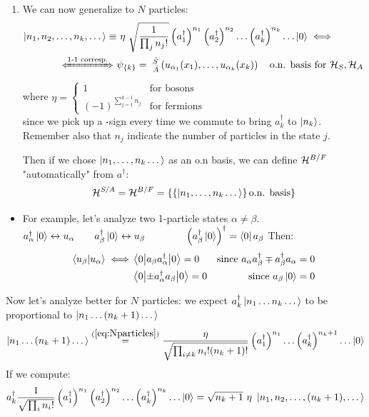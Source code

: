 \begin{enumerate}[label=\roman*.]
    \item We can now generalize to $N$ particles:
    \begin{align}
        \ket{n_1,n_2,\dots,n_k,\dots} \equiv& \ \eta \  \sqrt{\frac1{\prod_j n_j!}}\left(a_1^\dag\right)^{n_1}\left(a_2^\dag\right)^{n_2} \dots \left(a_k^\dag\right)^{n_k} \dots \ket 0 \iff \label{eq:Nparticles}\\
        \xLeftrightarrow{\text{1-1 corresp.}}\ &  \psi_{\{k\}} =\  ^{\hat S}_{\hat A}\left(u_{\alpha_1}(x_1), \dots, u_{\alpha_k}(x_k)\right) \quad \text {o.n. basis for $\hil_S, \hil_A$} \nonumber
    \end{align}
    where $\eta = \begin{cases} 1 &\text{for bosons} \\ (-1)^{\sum_{j=1}^{k-1} n_j} &\text{for fermions}\end{cases}$\\
    since we pick up a -sign every time we commute to bring $a_k^\dag$ to $\left|n_k\right\rangle$.\\
    Remember also that $n_j$ indicate the number of particles in the state $j$.
    
    Then if we chose $\left|n_1,\dots,n_k\dots\right\rangle$ as an o.n basis, we can define $\mathcal{H}^{B/F}$ "automatically" from $a^\dag$:
    $$ \mathcal{H}^{S/A} = \mathcal{H}^{B/F} = \left\{\left\{ \left|n_1,\dots,n_k\dots\right\rangle\right\} \text{o.n. basis}\right\}$$        
\end{enumerate}

\begin{itemize}
    \item For example, let's analyze two 1-particle states $\alpha \ne \beta$.\\
    $a_\alpha^\dag\left|0\right\rangle \leftrightarrow u_\alpha \qquad a_\beta^\dag \left|0\right\rangle \leftrightarrow u_\beta \qquad \qquad \left(a_\beta^\dag\left|0\right\rangle \right)^\dag = \left\langle0\right| a_\beta$ \qquad \qquad Then: 
    \begin{align*}
    \left\langle u_\beta \middle| u_\alpha \right\rangle \iff &\left\langle 0 \middle| a_\beta a_\alpha^\dag \middle| 0 \right\rangle = 0 &\text{since $a_\alpha a_\beta^\dag \mp a_\beta^\dag a_\alpha = 0$}\\
    & \left\langle 0 \middle| \pm a_\alpha^\dag a_\beta \middle| 0 \right\rangle = 0 &\text{since $a_\beta\left|0\right\rangle = 0$}
    \end{align*}
    
\end{itemize}
Now let's analyze better for $N$ particles: we expect $a_k^\dag \left|n_1 \dots n_k \dots\right\rangle$ to be proportional to $\left|n_1 \dots (n_k+1) \dots\right\rangle $
$$\left|n_1 \dots (n_k+1) \dots \right\rangle \stackrel{(\ref{eq:Nparticles})}= \frac\eta{\sqrt{\prod_{i\ne k} n_i!(n_k+1)!}} \left(a_1^\dag\right)^{n_1}\dots\left(a_k^\dag\right)^{n_k+1}\dots \left|0\right\rangle$$
If we compute:
$$ a_k^\dag \frac1{\sqrt{\prod_i n_i!}} \left(a_1^\dag\right)^{n_1}\left(a_2^\dag\right)^{n_2}\dots \left(a_k^\dag\right)^{n_k}\dots \ket 0 = \sqrt{n_k+1} \ \eta \ \ket{n_1,n_2, \dots, (n_k+1), \dots}$$

